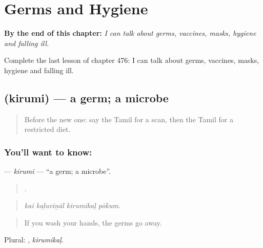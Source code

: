 
\chapter{Germs and Hygiene}
\label{ch:ta-germs-and-hygiene}

\begin{chapteropening}
\textbf{By the end of this chapter:} \emph{I can talk about germs, vaccines, masks, hygiene and falling ill.}

Complete the last lesson of chapter 476: I can talk about germs, vaccines, masks, hygiene and falling ill.
\end{chapteropening}

\section[\texorpdfstring{\ta{கிருமி} (kirumi)}{கிருமி (kirumi)}]{ (kirumi) — a germ; a microbe}

\label{lesson:TA-C476-kirumi}



\begin{quote}
Before the new one: say the Tamil for a scan, then the Tamil for a restricted diet.
\end{quote}

\subsection*{You'll want to know: }
\textbf{} — \emph{kirumi} — \textquotedblleft{}a germ; a microbe\textquotedblright{}.

\begin{quote}
   .
\end{quote}

\begin{quote}
\emph{kai kaḻuviṉāl kirumikaḷ pōkum.}
\end{quote}

\begin{quote}
If you wash your hands, the germs go away.
\end{quote}

Plural: , \emph{kirumikaḷ}.

